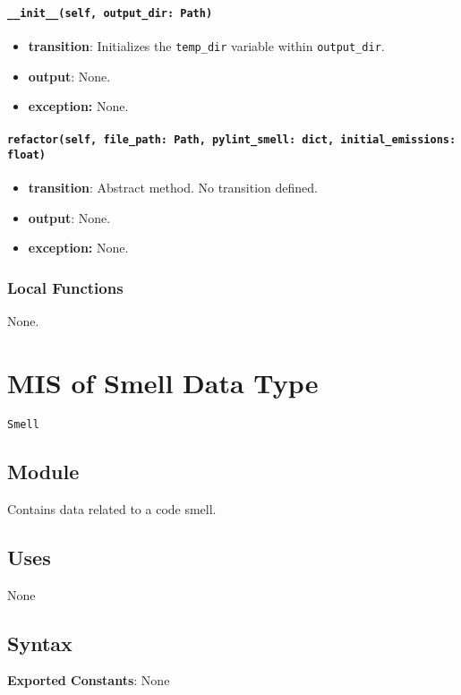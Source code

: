 \documentclass[12pt, titlepage]{article}
\begin{document}
\paragraph{\texttt{\_\_init\_\_(self, output\_dir: Path)}}
\begin{itemize}
  \item \textbf{transition}: Initializes the \texttt{temp\_dir} variable within \texttt{output\_dir}.
  \item \textbf{output}: None.
  \item \textbf{exception:} None.
\end{itemize}

\paragraph{\texttt{refactor(self, file\_path: Path, pylint\_smell: dict, initial\_emissions: float)}}
\begin{itemize}
  \item \textbf{transition}: Abstract method. No transition defined.
  \item \textbf{output}: None.
  \item \textbf{exception:} None.
\end{itemize}

\subsubsection{Local Functions}
None.

\newpage

\section{MIS of Smell Data Type} \label{mis:smell}
\texttt{Smell}

\subsection{Module}
Contains data related to a code smell.

\subsection{Uses}
None

\subsection{Syntax}
\noindent
\textbf{Exported Constants}: None
\end{document}
